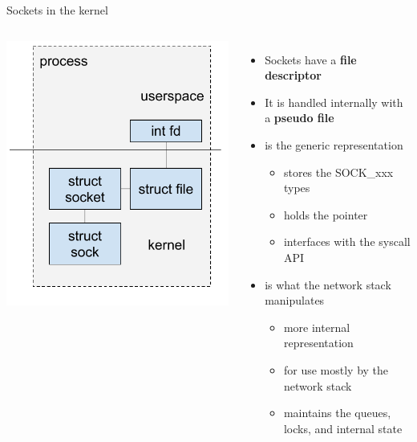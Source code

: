 \begin{frame}{Sockets in the kernel}
	\begin{columns}
			\includegraphics[width=\textwidth]{slides/networking-socket/socket_kernel.pdf}
		\begin{itemize}
			\item Sockets have a \textbf{file descriptor}
			\item It is handled internally with a \textbf{pseudo file}
			\item {} is the generic representation
				\begin{itemize}
					\item stores the SOCK\_xxx types
					\item holds the  pointer
					\item interfaces with the syscall API
				\end{itemize}
			\item {} is what the network stack manipulates
				\begin{itemize}
					\item more internal representation
					\item for use mostly by the network stack
					\item maintains the queues, locks, and internal state
				\end{itemize}
		\end{itemize}
	\end{columns}
\end{frame}

